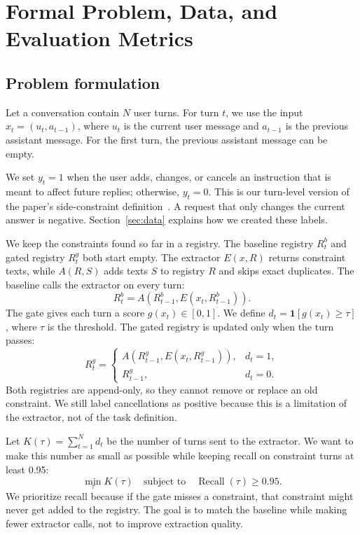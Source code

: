 \section{Formal Problem, Data, and Evaluation Metrics}
\subsection{Problem formulation}
\label{sec:problem}
Let a conversation contain $N$ user turns. For turn $t$, we use the input $x_t=(u_t,a_{t-1})$, where $u_t$ is the current user message and $a_{t-1}$ is the previous assistant message. For the first turn, the previous assistant message can be empty.

We set $y_t=1$ when the user adds, changes, or cancels an instruction that is meant to affect future replies; otherwise, $y_t=0$. This is our turn-level version of the paper's side-constraint definition~\cite{wang2026compaction}. A request that only changes the current answer is negative. Section~\ref{sec:data} explains how we created these labels.

We keep the constraints found so far in a registry. The baseline registry $R_t^b$ and gated registry $R_t^g$ both start empty. The extractor $E(x,R)$ returns constraint texts, while $A(R,S)$ adds texts $S$ to registry $R$ and skips exact duplicates. The baseline calls the extractor on every turn:
\begin{equation}
\label{eq:baseline}
R_t^b=A(R_{t-1}^b,E(x_t,R_{t-1}^b)).
\end{equation}
The gate gives each turn a score $g(x_t)\in[0,1]$. We define $d_t=\mathbf{1}[g(x_t)\geq\tau]$, where $\tau$ is the threshold. The gated registry is updated only when the turn passes:
\begin{equation}
\label{eq:gated}
R_t^g=\begin{cases}
A(R_{t-1}^g,E(x_t,R_{t-1}^g)),&d_t=1,\\
R_{t-1}^g,&d_t=0.
\end{cases}
\end{equation}
Both registries are append-only, so they cannot remove or replace an old constraint. We still label cancellations as positive because this is a limitation of the extractor, not of the task definition.

Let $K(\tau)=\sum_{t=1}^{N}d_t$ be the number of turns sent to the extractor. We want to make this number as small as possible while keeping recall on constraint turns at least 0.95:
\begin{equation}
\label{eq:objective}
\min_{\tau}K(\tau)\quad\text{subject to}\quad
\operatorname{Recall}(\tau)\geq0.95.
\end{equation}
We prioritize recall because if the gate misses a constraint, that constraint might never get added to the registry. The goal is to match the baseline while making fewer extractor calls, not to improve extraction quality.

